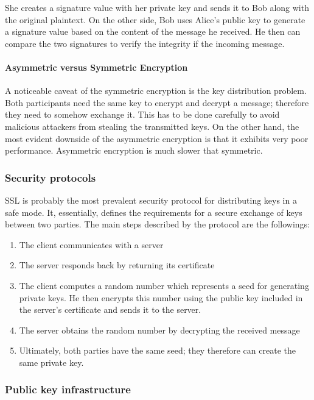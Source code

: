 She creates a signature value with her private key and sends it to Bob along with the original plaintext. On the other side, Bob uses Alice's public key to generate a signature value based on the content of the message he received. He then can compare the two signatures to verify the integrity if the incoming message.

\paragraph{Asymmetric versus Symmetric Encryption}

A noticeable caveat of the symmetric encryption is the key distribution problem. Both participants need the same key to encrypt and decrypt a message; therefore they need to somehow exchange it. This has to be done carefully to avoid malicious attackers from stealing the transmitted keys. On the other hand, the most evident downside of the asymmetric encryption is that it exhibits very poor performance. Asymmetric encryption is much slower that symmetric.

\subsubsection{Security protocols}

SSL is probably the most prevalent security protocol for distributing keys in a safe mode. It, essentially, defines the requirements for a secure exchange of keys between two parties. The main steps described by the protocol are the followings:

\begin{enumerate}
  \item
        The client communicates with a server
  \item
        The server responds back by returning its certificate
  \item
        The client computes a random number which represents a seed for generating private keys. He then encrypts this number using the public key included in the server's certificate and sends it to the server.
  \item
        The server obtains the random number by decrypting the received message
  \item
        Ultimately, both parties have the same seed; they therefore can create the same private key.
\end{enumerate}

\subsubsection{Public key infrastructure}

